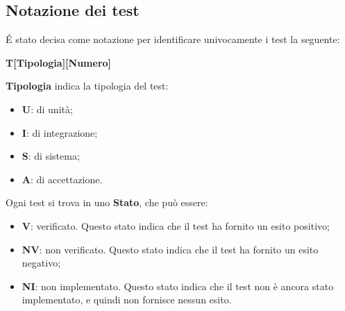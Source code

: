 \subsection{Notazione dei test}
\'E stato decisa come notazione per identificare univocamente i test la seguente:
\begin{center}
    \textbf{T[Tipologia][Numero]}
\end{center}
\textbf{Tipologia} indica la tipologia del test:
\begin{itemize}
    \item \textbf{U}: di unità;
    \item \textbf{I}: di integrazione;
    \item \textbf{S}: di sistema;
    \item \textbf{A}: di accettazione.
\end{itemize}
Ogni test si trova in uno \textbf{Stato}, che può essere:
\begin{itemize}
    \item \textbf{V}: verificato. Questo stato indica che il test ha fornito un esito positivo;
    \item \textbf{NV}: non verificato. Questo stato indica che il test ha fornito un esito negativo;
    \item \textbf{NI}: non implementato. Questo stato indica che il test non è ancora stato implementato, e quindi non fornisce nessun esito.
\end{itemize}

